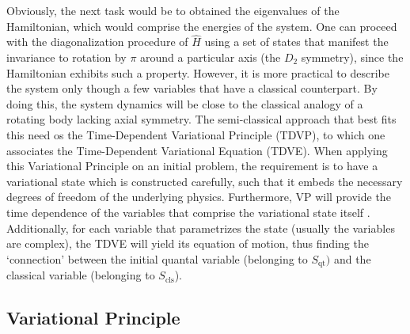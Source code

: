 Obviously, the next task would be to obtained the eigenvalues of the Hamiltonian, which would comprise the energies of the system. One can proceed with the diagonalization procedure of $\hat{H}$ using a set of states that manifest the invariance to rotation by $\pi$ around a particular axis (the $D_2$ symmetry), since the Hamiltonian exhibits such a property. However, it is more practical to describe the system only though a few variables that have a classical counterpart. By doing this, the system dynamics will be close to the classical analogy of a rotating body lacking axial symmetry. The semi-classical approach that best fits this need os the Time-Dependent Variational Principle (TDVP), to which one associates the Time-Dependent Variational Equation (TDVE). When applying this Variational Principle on an initial problem, the requirement is to have a variational state which is constructed carefully, such that it embeds the necessary degrees of freedom of the underlying physics. Furthermore, VP will provide the time dependence of the variables that comprise the variational state itself \cite{budaca2018tilted}. Additionally, for each variable that parametrizes the state (usually the variables are complex), the TDVE will yield its equation of motion, thus finding the `connection' between the initial quantal variable (belonging to $S_\text{qt})$ and the classical variable (belonging to $S_\text{cls}$).

\subsection{Variational Principle}

